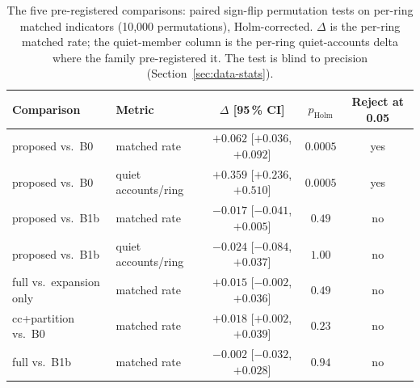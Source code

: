 \begin{table}[t]
\centering
\caption{The five pre-registered comparisons: paired sign-flip permutation tests on per-ring
matched indicators (10{,}000 permutations), Holm-corrected. $\Delta$ is the per-ring matched
rate; the quiet-member column is the per-ring quiet-accounts delta where the family
pre-registered it. The test is blind to precision (Section~\ref{sec:data-stats}).}
\label{tab:significance}
\small
\begin{tabular}{llccc}
\toprule
Comparison & Metric & $\Delta$ [95\,\% CI] & $p_{\mathrm{Holm}}$ & Reject at 0.05 \\
\midrule
proposed vs.\ B0  & matched rate & $+0.062$ [$+0.036$, $+0.092$] & $0.0005$ & yes \\ %
proposed vs.\ B0  & quiet accounts/ring & $+0.359$ [$+0.236$, $+0.510$] & $0.0005$ & yes \\ %
proposed vs.\ B1b & matched rate & $-0.017$ [$-0.041$, $+0.005$] & $0.49$ & no \\ %
proposed vs.\ B1b & quiet accounts/ring & $-0.024$ [$-0.084$, $+0.037$] & $1.00$ & no \\ %
full vs.\ expansion only & matched rate & $+0.015$ [$-0.002$, $+0.036$] & $0.49$ & no \\ %
cc+partition vs.\ B0 & matched rate & $+0.018$ [$+0.002$, $+0.039$] & $0.23$ & no \\ %
full vs.\ B1b & matched rate & $-0.002$ [$-0.032$, $+0.028$] & $0.94$ & no \\ %
\bottomrule
\end{tabular}
\end{table}
